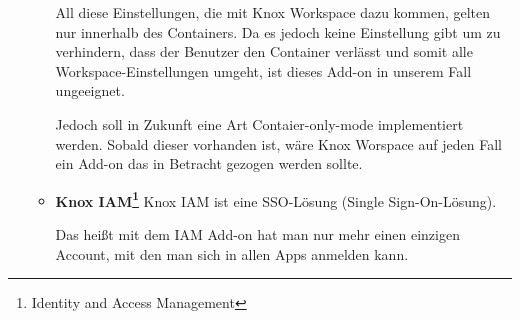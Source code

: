 \begin{itemize}
\begin{itemize}
\begin{itemize}
		\end{itemize}
	All diese Einstellungen, die mit Knox Workspace dazu kommen, gelten nur innerhalb des Containers. Da es jedoch keine Einstellung gibt um zu verhindern, dass der Benutzer den Container verlässt und somit alle Workspace-Einstellungen umgeht, ist dieses Add-on in unserem Fall ungeeignet. \par Jedoch soll in Zukunft eine Art Contaier-only-mode implementiert werden. Sobald dieser vorhanden ist, wäre Knox Worspace auf jeden Fall ein Add-on das in Betracht gezogen werden sollte.
		\item \textbf{Knox IAM\footnote{Identity and Access Management}} \newline
		Knox IAM ist eine SSO-Lösung (Single Sign-On-Lösung). \par Das heißt mit dem IAM Add-on hat man nur mehr einen einzigen Account, mit den man sich in allen Apps anmelden kann.
	\end{itemize}
\end{itemize}
